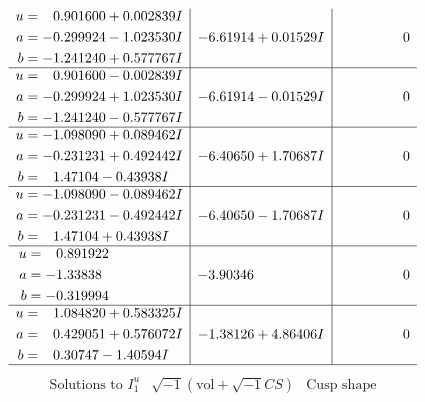 \documentclass[1p]{elsarticle_modified}
\theoremstyle{definition}
\newcommand{\I}{\sqrt{-1}}
\begin{document}
$$\begin{array}{c|c|c}
\begin{aligned}
u &= \phantom{-}0.901600 + 0.002839 I \\
a &= -0.299924 - 1.023530 I \\
b &= -1.241240 + 0.577767 I\end{aligned}
 & -6.61914 + 0.01529 I & \phantom{-0.000000 } 0 \\ \hline\begin{aligned}
u &= \phantom{-}0.901600 - 0.002839 I \\
a &= -0.299924 + 1.023530 I \\
b &= -1.241240 - 0.577767 I\end{aligned}
 & -6.61914 - 0.01529 I & \phantom{-0.000000 } 0 \\ \hline\begin{aligned}
u &= -1.098090 + 0.089462 I \\
a &= -0.231231 + 0.492442 I \\
b &= \phantom{-}1.47104 - 0.43938 I\end{aligned}
 & -6.40650 + 1.70687 I & \phantom{-0.000000 } 0 \\ \hline\begin{aligned}
u &= -1.098090 - 0.089462 I \\
a &= -0.231231 - 0.492442 I \\
b &= \phantom{-}1.47104 + 0.43938 I\end{aligned}
 & -6.40650 - 1.70687 I & \phantom{-0.000000 } 0 \\ \hline\begin{aligned}
u &= \phantom{-}0.891922\phantom{ +0.000000I} \\
a &= -1.33838\phantom{ +0.000000I} \\
b &= -0.319994\phantom{ +0.000000I}\end{aligned}
 & -3.90346\phantom{ +0.000000I} & \phantom{-0.000000 } 0 \\ \hline\begin{aligned}
u &= \phantom{-}1.084820 + 0.583325 I \\
a &= \phantom{-}0.429051 + 0.576072 I \\
b &= \phantom{-}0.30747 - 1.40594 I\end{aligned}
 & -1.38126 + 4.86406 I & \phantom{-0.000000 } 0\\
 \hline 
 \end{array}$$\newpage$$\begin{array}{c|c|c}  
\text{Solutions to }I^u_{1}& \I (\text{vol} + \sqrt{-1}CS) & \text{Cusp shape}\\
 \hline 
\begin{aligned}

\end{aligned}
\end{array}$$
\end{document}
